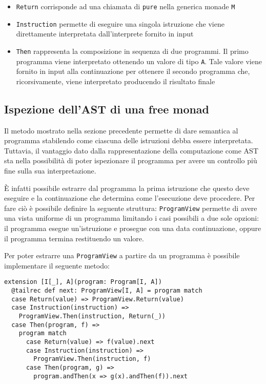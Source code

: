 \begin{itemize}
  \item \lstinline{Return} corrisponde ad una chiamata di \lstinline{pure} nella generica monade \lstinline{M}
  \item \lstinline{Instruction} permette di eseguire una singola istruzione che viene direttamente interpretata dall'interprete fornito in input
  \item \lstinline{Then} rappresenta la composizione in sequenza di due programmi. Il primo programma viene interpretato ottenendo un valore di tipo \lstinline{A}. Tale valore viene fornito in input alla continuazione per ottenere il secondo programma che, ricorsivamente, viene interpretato producendo il risultato finale
\end{itemize}

\subsection{Ispezione dell'AST di una free monad}
Il metodo mostrato nella sezione precedente permette di dare semantica al programma stabilendo come ciascuna delle istruzioni debba essere interpretata.
Tuttavia, il vantaggio dato dalla rappresentazione della computazione come AST sta nella possibilità di poter ispezionare il programma per avere un controllo più fine sulla sua interpretazione.

È infatti possibile estrarre dal programma la prima istruzione che questo deve eseguire e la continuazione che determina come l'esecuzione deve procedere. Per fare ciò è possibile definire la seguente struttura:
\lstinline{ProgramView} permette di avere una vista uniforme di un programma limitando i casi possibili a due sole opzioni: il programma esegue un'istruzione e prosegue con una data continuazione, oppure il programma termina restituendo un valore.

Per poter estrarre una \lstinline{ProgramView} a partire da un programma è possibile implementare il seguente metodo:
\begin{lstlisting}[language=scala3]
extension [I[_], A](program: Program[I, A])
  @tailrec def next: ProgramView[I, A] = program match
  case Return(value) => ProgramView.Return(value)
  case Instruction(instruction) =>
    ProgramView.Then(instruction, Return(_))
  case Then(program, f) =>
    program match
      case Return(value) => f(value).next
      case Instruction(instruction) =>
        ProgramView.Then(instruction, f)
      case Then(program, g) =>
        program.andThen(x => g(x).andThen(f)).next
\end{lstlisting}

